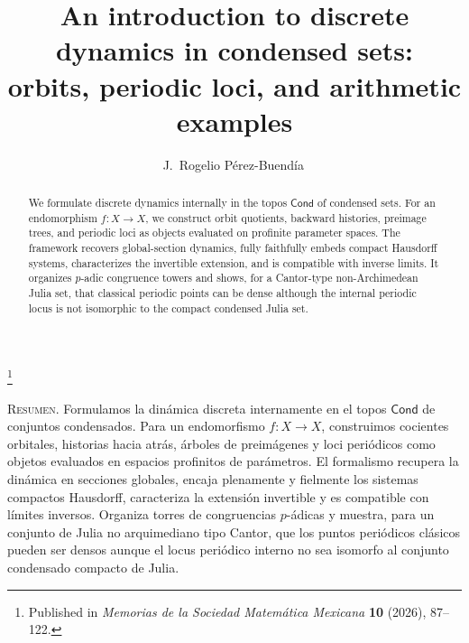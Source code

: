\documentclass[10pt]{amsart}
\newcommand{\Cond}{\mathsf{Cond}}
\theoremstyle{plain}
\theoremstyle{definition}
\begin{document}
\title[An introduction to discrete dynamics in condensed sets]{An introduction to discrete dynamics in condensed sets:\\
orbits, periodic loci, and arithmetic examples}

\author[J. Rogelio P\'erez-Buend\'ia]{J.~Rogelio P\'erez-Buend\'ia\,}
\thanks{Published in \emph{Memorias de la Sociedad Matem\'atica Mexicana} \textbf{10} (2026), 87--122.}
\address{SECIHTI -- Centro de Investigaci\'on en Matem\'aticas (CIMAT),\newline
Unidad M\'erida, M\'erida, Mexico}



\begin{abstract}
We formulate discrete dynamics internally in the topos $\Cond$ of condensed
sets. For an endomorphism $f:X\to X$, we construct orbit quotients, backward
histories, preimage trees, and periodic loci as objects evaluated on profinite
parameter spaces. The framework recovers global-section dynamics, fully
faithfully embeds compact Hausdorff systems, characterizes the invertible
extension, and is compatible with inverse limits. It organizes $p$-adic
congruence towers and shows, for a Cantor-type non-Archimedean Julia set, that
classical periodic points can be dense although the internal periodic locus is
not isomorphic to the compact condensed Julia set.
\end{abstract}

\maketitle

\begin{center}
\begin{minipage}{\textwidth}
\small
\noindent\textsc{Resumen.}
Formulamos la din\'amica discreta internamente en el topos $\Cond$ de conjuntos
condensados. Para un endomorfismo $f:X\to X$, construimos cocientes orbitales,
historias hacia atr\'as, \'arboles de preim\'agenes y loci peri\'odicos como
objetos evaluados en espacios profinitos de par\'ametros. El formalismo recupera
la din\'amica en secciones globales, encaja plenamente y fielmente los sistemas
compactos Hausdorff, caracteriza la extensi\'on invertible y es compatible con
l\'imites inversos. Organiza torres de congruencias $p$-\'adicas y muestra, para
un conjunto de Julia no arquimediano tipo Cantor, que los puntos peri\'odicos
cl\'asicos pueden ser densos aunque el locus peri\'odico interno no sea isomorfo
al conjunto condensado compacto de Julia.
\end{minipage}
\end{center}
\end{document}
